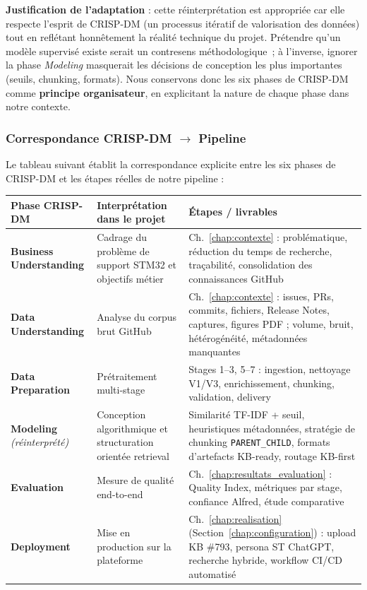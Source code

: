 \documentclass[12pt,a4paper]{report}
\begin{document}
\textbf{Justification de l'adaptation} : cette réinterprétation est appropriée car elle respecte l'esprit de CRISP-DM (un processus itératif de valorisation des données) tout en reflétant honnêtement la réalité technique du projet. Prétendre qu'un modèle supervisé existe serait un contresens méthodologique~; à l'inverse, ignorer la phase \textit{Modeling} masquerait les décisions de conception les plus importantes (seuils, chunking, formats). Nous conservons donc les six phases de CRISP-DM comme \textbf{principe organisateur}, en explicitant la nature de chaque phase dans notre contexte.

\subsubsection{Correspondance CRISP-DM \texorpdfstring{$\rightarrow$}{->} Pipeline}
\label{sec:crispdm_mapping}

Le tableau suivant établit la correspondance explicite entre les six phases de CRISP-DM et les étapes réelles de notre pipeline :

\begin{longtable}{p{3cm}p{5cm}p{5cm}}
\toprule
\textbf{Phase CRISP-DM} & \textbf{Interprétation dans le projet} & \textbf{Étapes / livrables} \\
\midrule
\textbf{Business Understanding} & Cadrage du problème de support STM32 et objectifs métier & Ch.~\ref{chap:contexte} : problématique, réduction du temps de recherche, traçabilité, consolidation des connaissances GitHub \\
\textbf{Data Understanding} & Analyse du corpus brut GitHub & Ch.~\ref{chap:contexte} : issues, PRs, commits, fichiers, Release Notes, captures, figures PDF ; volume, bruit, hétérogénéité, métadonnées manquantes \\
\textbf{Data Preparation} & Prétraitement multi-stage & Stages 1--3, 5--7 : ingestion, nettoyage V1/V3, enrichissement, chunking, validation, delivery \\
\textbf{Modeling} \textit{(réinterprété)} & Conception algorithmique et structuration orientée retrieval & Similarité TF-IDF + seuil, heuristiques métadonnées, stratégie de chunking \texttt{PARENT\_CHILD}, formats d'artefacts KB-ready, routage KB-first \\
\textbf{Evaluation} & Mesure de qualité end-to-end & Ch.~\ref{chap:resultats_evaluation} : Quality Index, métriques par stage, confiance Alfred, étude comparative \\
\textbf{Deployment} & Mise en production sur la plateforme & Ch.~\ref{chap:realisation} (Section~\ref{chap:configuration}) : upload KB \#793, persona ST ChatGPT, recherche hybride, workflow CI/CD automatisé \\
\bottomrule
\end{longtable}
\end{document}
